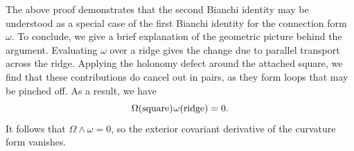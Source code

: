 The above proof demonstrates that the second Bianchi identity may be understood as a special case of the first Bianchi identity for the connection form $\omega$. To conclude, we give a brief explanation of the geometric picture behind the argument. Evaluating $\omega$ over a ridge gives the change due to parallel transport across the ridge. Applying the holonomy defect around the attached square, we find that these contributions do cancel out in pairs, as they form  loops that may be pinched off. As a result, we have
\begin{equation}
  \Omega(\text{square}) \mskip 1mu \omega(\text{ridge}) = 0.
\end{equation}
It follows that $\Omega \wedge \omega = 0$, so the exterior covariant derivative of the curvature form vanishes. 


